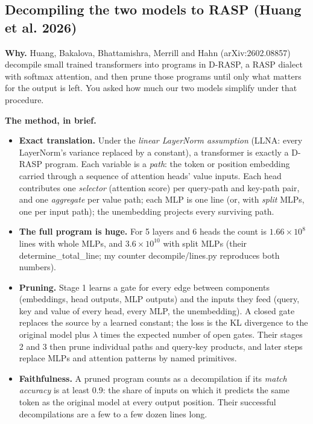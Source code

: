\documentclass[paper=a4,fontsize=11pt,DIV=11,parskip=half,headings=small,numbers=noendperiod]{scrartcl}
\DeclareRobustCommand{\lead}[1]{\textsf{\bfseries\color{accent}#1}}
\DeclareRobustCommand{\code}[1]{{\fontseries{m}\ttfamily #1}}
\begin{document}
\subsection{Decompiling the two models to RASP (Huang et al. 2026)}\label{sec:3.22}
\lead{Why.} Huang, Bakalova, Bhattamishra, Merrill and Hahn (arXiv:2602.08857) decompile small trained
transformers into programs in D-RASP, a RASP dialect with softmax attention, and then prune those programs until
only what matters for the output is left. You asked how much our two models simplify under that procedure.

\lead{The method, in brief.}

\begin{itemize}
\item \lead{Exact translation.} Under the \emph{linear LayerNorm assumption} (LLNA: every LayerNorm’s variance
  replaced by a constant), a transformer is exactly a D-RASP program. Each variable is a \emph{path}: the token
  or position embedding carried through a sequence of attention heads’ value inputs. Each head contributes one
  \emph{selector} (attention score) per query-path and key-path pair, and one \emph{aggregate} per value path;
  each MLP is one line (or, with \emph{split} MLPs, one per input path); the unembedding projects every
  surviving path.
\item \lead{The full program is huge.} For 5 layers and 6 heads the count is $1.66\times10^{8}$ lines with whole
  MLPs, and $3.6\times10^{10}$ with split MLPs (their \code{determine\_\allowbreak{}total\_\allowbreak{}line};
  my counter \code{decompile/\allowbreak{}lines.\allowbreak{}py} reproduces both numbers).
\item \lead{Pruning.} Stage 1 learns a gate for every edge between components (embeddings, head outputs, MLP
  outputs) and the inputs they feed (query, key and value of every head, every MLP, the unembedding). A closed
  gate replaces the source by a learned constant; the loss is the KL divergence to the original model plus
  $\lambda$ times the expected number of open gates. Their stages 2 and 3 then prune individual paths and
  query-key products, and later steps replace MLPs and attention patterns by named primitives.
\item \lead{Faithfulness.} A pruned program counts as a decompilation if its \emph{match accuracy} is at least
  0.9: the share of inputs on which it predicts the same token as the original model at every output position.
  Their successful decompilations are a few to a few dozen lines long.
\end{itemize}
\end{document}
